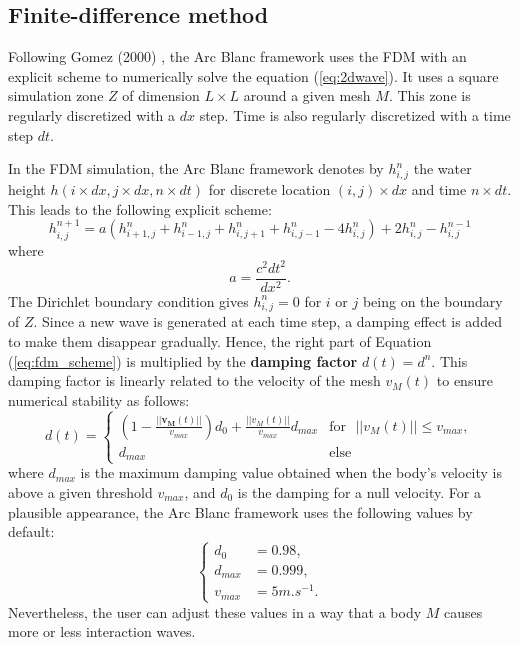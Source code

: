 \documentclass[final]{jcgt}
\def\framework{the Arc Blanc framework\xspace}
\begin{document}
\subsection{Finite-difference method}
\label{subsec:finiteDifferenceMethod}
Following Gomez (2000) \cite{gomezInteractiveSimulationWater2000},
\framework  uses the FDM with an explicit scheme to numerically solve the equation (\ref{eq:2dwave}).
It uses a square simulation zone $Z$ of dimension $L\times L$ around a given mesh $M$.
This zone is regularly discretized with a $dx$ step.
Time is also regularly discretized with a time step $dt$.

In the FDM simulation, \framework denotes by $h_{i,j}^n$ the water height $h(i\times dx,j\times dx,n \times dt)$ for discrete location $(i,j)\times dx$ and time $n\times dt$.
This leads to the following explicit scheme:
\begin{equation}
	\label{eq:fdm_scheme}
	h_{i,j}^{n+1} = a\left(h_{i+1,j}^n+h_{i-1,j}^n+h_{i,j+1}^n+h_{i,j-1}^n-4h_{i,j}^n\right) + 2h_{i,j}^n - h_{i,j}^{n-1}
\end{equation}
where
\begin{equation}
	a=\frac{c^2dt^2}{dx^2}.
\end{equation}
The Dirichlet boundary condition gives $h_{i,j}^n=0$ for $i$ or $j$ being on the boundary of $Z$.
Since a new wave is generated at each time step, a damping effect is added to make them disappear gradually.
Hence, the right part of Equation (\ref{eq:fdm_scheme}) is multiplied by the \textbf{damping factor} $d(t)=d^n$.
This damping factor is linearly related to the velocity of the mesh $v_M(t)$ to ensure numerical stability as follows:
\begin{equation}
	d(t) =
	\begin{cases}
		\left(1-\frac{||\mathbf{v_M}(t)||}{v_{max}}\right)d_0 + \frac{||v_M(t)||}{v_{max}}d_{max} & \text{for~~}||v_M(t)||\leq v_{max}, \\
		d_{max}                                                                          & \text{else}
	\end{cases}
\end{equation}
where $d_{max}$ is the maximum damping value obtained when the body's velocity is above a given threshold $v_{max}$,
and $d_0$ is the damping for a null velocity.
For a plausible appearance, \framework uses the following values by default:
\begin{equation}
	\begin{cases}
		d_0     & = 0.98,       \\
		d_{max} & = 0.999,      \\
		v_{max} & = 5 m.s^{-1}.
	\end{cases}
\end{equation}
Nevertheless, the user can adjust these values in a way that a body $M$ causes more or less interaction waves.
\end{document}
